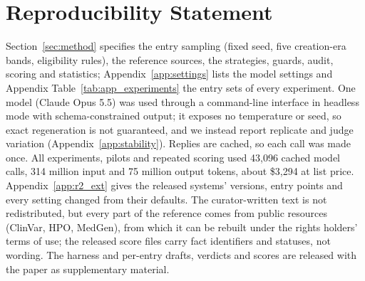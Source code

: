 \documentclass{article} %
\begin{document}
\section*{Reproducibility Statement}
Section~\ref{sec:method} specifies the entry sampling (fixed seed, five creation-era bands, eligibility rules), the reference sources, the strategies, guards, audit, scoring and statistics; Appendix~\ref{app:settings} lists the model settings and Appendix Table~\ref{tab:app_experiments} the entry sets of every experiment. One model (Claude Opus 5.5) was used through a command-line interface in headless mode with schema-constrained output; it exposes no temperature or seed, so exact regeneration is not guaranteed, and we instead report replicate and judge variation (Appendix~\ref{app:stability}). Replies are cached, so each call was made once. All experiments, pilots and repeated scoring used 43,096 cached model calls, 314 million input and 75 million output tokens, about \$3,294 at list price. Appendix~\ref{app:r2_ext} gives the released systems' versions, entry points and every setting changed from their defaults. The curator-written text is not redistributed, but every part of the reference comes from public resources (ClinVar, HPO, MedGen), from which it can be rebuilt under the rights holders' terms of use; the released score files carry fact identifiers and statuses, not wording. The harness and per-entry drafts, verdicts and scores are released with the paper as supplementary material.




\clearpage
\appendix
\setlength{\belowcaptionskip}{4pt}
\makeatletter
\setlength{\@fptop}{0pt}
\setlength{\@fpbot}{0pt plus 1fil}
\setlength{\@fpsep}{8pt plus 2pt minus 2pt}
\setlength{\abovecaptionskip}{4pt}
\setlength{\intextsep}{8pt plus 2pt minus 2pt}
\setlength{\floatsep}{8pt plus 2pt minus 2pt}
\setlength{\textfloatsep}{12pt plus 2pt minus 2pt}
\makeatother
\FloatBarrier
\end{document}
